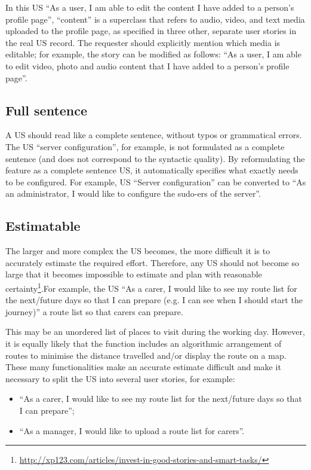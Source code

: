 In this US \enquote{As a user, I am able to edit the content I have added to a person's profile page}, \enquote{content} is a superclass that refers to audio, video, and text media uploaded to the profile page, as specified in three other, separate user stories in the real US record. The requester should explicitly mention which media is editable; for example, the story can be modified as follows: \enquote{As a user, I am able to edit video, photo and audio content that I have added to a person's profile page}.
\subsection*{\normalsize{Full sentence}}
A US should read like a complete sentence, without typos or grammatical errors. The US \enquote{server configuration}, for example, is not formulated as a complete sentence (and does not correspond to the syntactic quality). By reformulating the feature as a complete sentence US, it automatically specifies what exactly needs to be configured. For example, US \enquote{Server configuration} can be converted to \enquote{As an administrator, I would like to configure the sudo-ers of the server}.
\subsection*{\normalsize{Estimatable}}
The larger and more complex the US becomes, the more difficult it is to accurately estimate the required effort. Therefore, any US should not become so large that it becomes impossible to estimate and plan with reasonable certainty\footnote{\href{http://xp123.com/articles/invest-in-good-stories-and-smart-tasks/}{http://xp123.com/articles/invest-in-good-stories-and-smart-tasks/}}.For example, the US \enquote{As a carer, I would like to see my route list for the next/future days so that I can prepare (e.g. I can see when I should start the journey)} a route list so that carers can prepare.

This may be an unordered list of places to visit during the working day. However, it is equally likely that the function includes an algorithmic arrangement of routes to minimise the distance travelled and/or display the route on a map. These many functionalities make an accurate estimate difficult and make it necessary to split the US into several user stories, for example:
\begin{itemize}
\item \enquote{As a carer, I would like to see my route list for the next/future days so that I can prepare};
\item \enquote{As a manager, I would like to upload a route list for carers}.
\end{itemize}

